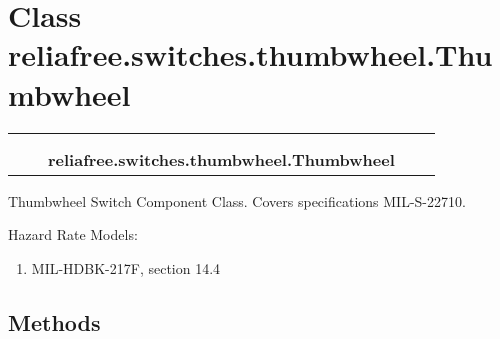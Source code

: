 %
%
%


\section{Class reliafree.switches.thumbwheel.Thumbwheel}

    \label{reliafree:switches:thumbwheel:Thumbwheel}
\begin{tabular}{cccccc}
\multicolumn{2}{r}{\settowidth{\BCL}{reliafree.switches.switch.Switch}\multirow{2}{\BCL}{reliafree.switches.switch.Switch}}
&&
  \\\cline{3-3}
  &&\multicolumn{1}{c|}{}
&&
  \\
&&\multicolumn{2}{l}{\textbf{reliafree.switches.thumbwheel.Thumbwheel}}
\end{tabular}

Thumbwheel Switch Component Class. Covers specifications MIL-S-22710.

Hazard Rate Models:

\begin{enumerate}

\setlength{\parskip}{0.5ex}
  \item MIL-HDBK-217F, section 14.4

\end{enumerate}



  \subsection{Methods}

    \vspace{0.5ex}

